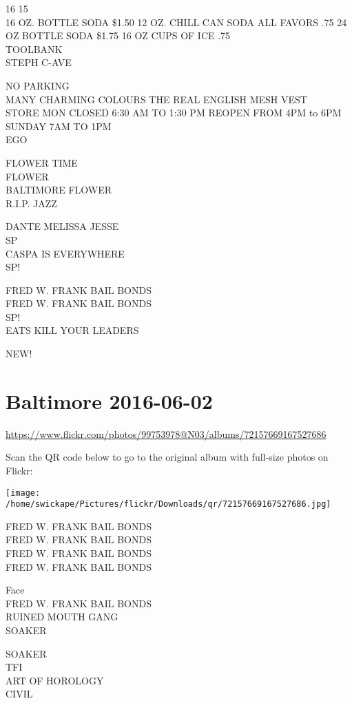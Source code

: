 \documentclass[10pt,letterpaper]{article}
\begin{document}
16 15\\
16 OZ. BOTTLE SODA \$1.50 12 OZ. CHILL CAN SODA ALL FAVORS .75 24 OZ BOTTLE SODA \$1.75 16 OZ CUPS OF ICE .75\\
TOOLBANK\\
STEPH C{-}AVE

NO PARKING\\
MANY CHARMING COLOURS THE REAL ENGLISH MESH VEST\\
STORE MON CLOSED 6:30 AM TO 1:30 PM REOPEN FROM 4PM to 6PM SUNDAY 7AM TO 1PM\\
EGO

FLOWER TIME\\
FLOWER\\
BALTIMORE FLOWER\\
R.I.P. JAZZ

DANTE MELISSA JESSE\\
SP\\
CASPA IS EVERYWHERE\\
SP!

FRED W. FRANK BAIL BONDS\\
FRED W. FRANK BAIL BONDS\\
SP!\\
EATS KILL YOUR LEADERS

NEW!


\section*{Baltimore 2016-06-02}

\url{https://www.flickr.com/photos/99753978@N03/albums/72157669167527686}

Scan the QR code below to go to the original album with full-size photos on Flickr:

\texttt{[image: /home/swickape/Pictures/flickr/Downloads/qr/72157669167527686.jpg]}


FRED W. FRANK BAIL BONDS\\
FRED W. FRANK BAIL BONDS\\
FRED W. FRANK BAIL BONDS\\
FRED W. FRANK BAIL BONDS

Face\\
FRED W. FRANK BAIL BONDS\\
RUINED MOUTH GANG\\
SOAKER

SOAKER\\
TFI\\
ART OF HOROLOGY\\
CIVIL
\end{document}

